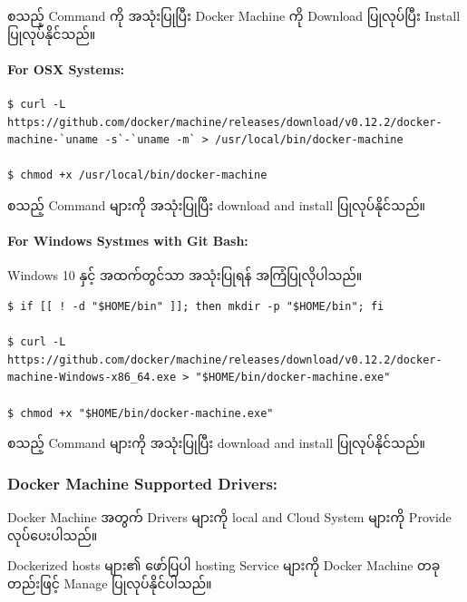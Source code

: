 စသည့် Command ကို အသုံးပြုပြီး Docker Machine ကို Download ပြုလုပ်ပြီး
Install ပြုလုပ်နိုင်သည်။

\paragraph{For OSX Systems:}\label{for-osx-systems}

\begin{verbatim}
$ curl -L https://github.com/docker/machine/releases/download/v0.12.2/docker-machine-`uname -s`-`uname -m` > /usr/local/bin/docker-machine

$ chmod +x /usr/local/bin/docker-machine
\end{verbatim}

စသည့် Command များကို အသုံးပြုပြီး download and install ပြုလုပ်နိုင်သည်။

\paragraph{For Windows Systmes with Git
Bash:}\label{for-windows-systmes-with-git-bash}

Windows 10 နှင့် အထက်တွင်သာ အသုံးပြုရန် အကြံပြုလိုပါသည်။

\begin{verbatim}
$ if [[ ! -d "$HOME/bin" ]]; then mkdir -p "$HOME/bin"; fi

$ curl -L https://github.com/docker/machine/releases/download/v0.12.2/docker-machine-Windows-x86_64.exe > "$HOME/bin/docker-machine.exe"

$ chmod +x "$HOME/bin/docker-machine.exe"
\end{verbatim}

စသည့် Command များကို အသုံးပြုပြီး download and install ပြုလုပ်နိုင်သည်။

\subsubsection{Docker Machine Supported
Drivers:}\label{docker-machine-supported-drivers}

Docker Machine အတွက် Drivers များကို local and Cloud System များကို
Provide လုပ်ပေးပါသည်။

Dockerized hosts များ၏ ဖော်ပြပါ hosting Service များကို Docker Machine
တခုတည်းဖြင့် Manage ပြုလုပ်နိုင်ပါသည်။


